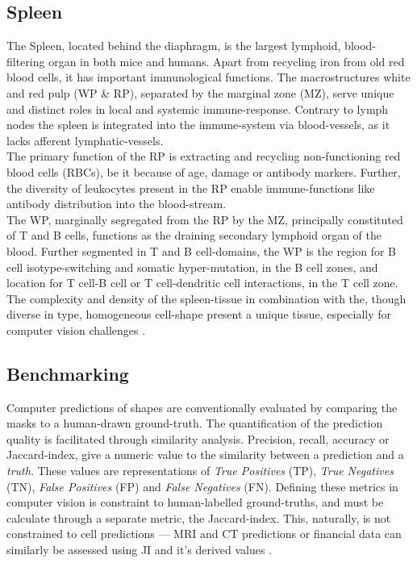 \subsection*{Spleen}
The Spleen, located behind the diaphragm, is the largest lymphoid, blood-filtering organ in both mice and humans. Apart from recycling iron from old red blood cells, it has important immunological functions. The macrostructures white and red pulp (WP \& RP), separated by the marginal zone (MZ), serve unique and distinct roles in local and systemic immune-response. Contrary to lymph nodes the spleen is integrated into the immune-system via blood-vessels, as it lacks afferent lymphatic-vessels. \cite{mebius_structure_2005} \cite{cesta_normal_2006} \cite{bronte_spleen_2013} \cite{lewis_structure_2019}\\
The primary function of the RP is extracting and recycling non-functioning red blood cells (RBCs), be it because of age, damage or antibody markers. Further, the diversity of leukocytes present in the RP enable immune-functions like antibody distribution into the blood-stream.\\
The WP, marginally segregated from the RP by the MZ, principally constituted of T and B cells, functions as the draining secondary lymphoid organ of the blood. Further segmented in T and B cell-domains, the WP is the region for B cell isotype-switching and somatic hyper-mutation, in the B cell zones, and location for T cell-B cell or T cell-dendritic cell interactions, in the T cell zone.\\
The complexity and density of the spleen-tissue in combination with the, though diverse in type, homogeneous cell-shape present a unique tissue, especially for computer vision challenges \cite{shi_cellbindb_2025}.
\subsection*{Benchmarking}
Computer predictions of shapes are conventionally evaluated by comparing the masks to a human-drawn ground-truth. The quantification of the prediction quality is facilitated through similarity analysis. Precision, recall, accuracy or Jaccard-index, give a numeric value to the similarity between a prediction and a \emph{truth}. These values are representations of \textit{True Positives} (TP), \textit{True Negatives} (TN), \textit{False Positives} (FP) and \textit{False Negatives} (FN). Defining these metrics in computer vision is constraint to human-labelled ground-truths, and must be calculate through a separate metric, the Jaccard-index. This, naturally, is not constrained to cell predictions --- MRI and CT predictions or financial data can similarly be assessed using JI and it's derived values \cite{durkee_generalizations_2023}. 
